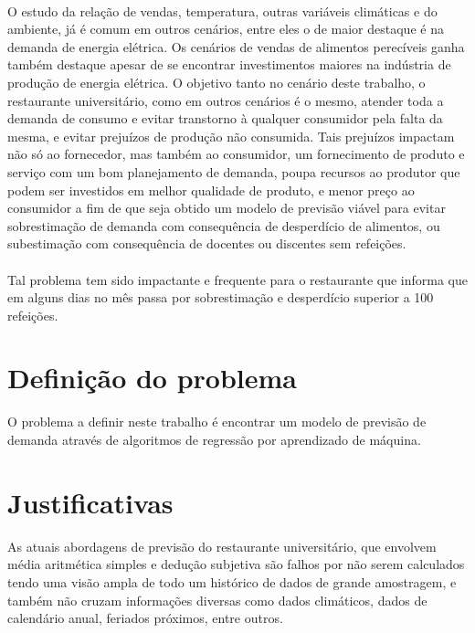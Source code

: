 \documentclass[	12pt, Times, openright, twoside, a4paper, english, brazil]{abntex2}
\begin{document}
\paragraph*{} O estudo da relação de vendas, temperatura, outras variáveis climáticas e do ambiente, já é comum em outros cenários, entre eles o de maior destaque é na demanda de energia elétrica. Os cenários de vendas de alimentos perecíveis ganha também destaque apesar de se encontrar investimentos maiores na indústria de produção de energia elétrica. O objetivo tanto no cenário deste trabalho, o restaurante universitário, como em outros cenários é o mesmo, atender toda a demanda de consumo e evitar transtorno à qualquer consumidor pela falta da mesma, e evitar prejuízos de produção não consumida. Tais prejuízos impactam não só ao fornecedor, mas também ao consumidor, um fornecimento de produto e serviço com um bom planejamento de demanda, poupa recursos ao produtor que podem ser investidos em melhor qualidade de produto, e menor preço ao consumidor a fim de que seja obtido um modelo de previsão viável para evitar sobrestimação de demanda com consequência de desperdício de alimentos, ou subestimação com consequência de docentes ou discentes sem refeições. 

\paragraph*{} Tal problema tem sido impactante e frequente para o restaurante que informa que em alguns
dias no mês passa por sobrestimação e desperdício superior a 100 refeições. 

\section{Definição do problema}
O problema a definir neste trabalho é encontrar um modelo de previsão de demanda através de algoritmos de regressão por aprendizado de máquina.

\section{Justificativas}
As atuais abordagens de previsão do restaurante universitário, que envolvem média aritmética simples e dedução subjetiva são falhos por não serem calculados tendo uma visão ampla de todo um histórico de dados de grande amostragem, e também não cruzam informações diversas como dados climáticos, dados de calendário anual, feriados próximos, entre outros.
\end{document}
